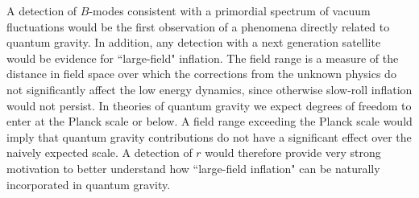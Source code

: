 
A detection of $B$-modes consistent with a primordial spectrum of vacuum fluctuations would be the first observation of a phenomena directly related to quantum gravity. In addition, any detection with a next generation satellite would be evidence for ``large-field" inflation. The field range is a measure of the distance in field space over which the corrections from the unknown physics do not significantly affect the low energy dynamics, since otherwise slow-roll inflation would not persist. In theories of quantum gravity we expect degrees of freedom to enter at the Planck scale or below. A field range exceeding the Planck scale would imply that quantum gravity contributions do not have a significant effect over the naively expected scale. A detection of $r$ would therefore provide very strong motivation to better understand how ``large-field inflation" can be naturally incorporated in quantum gravity.

